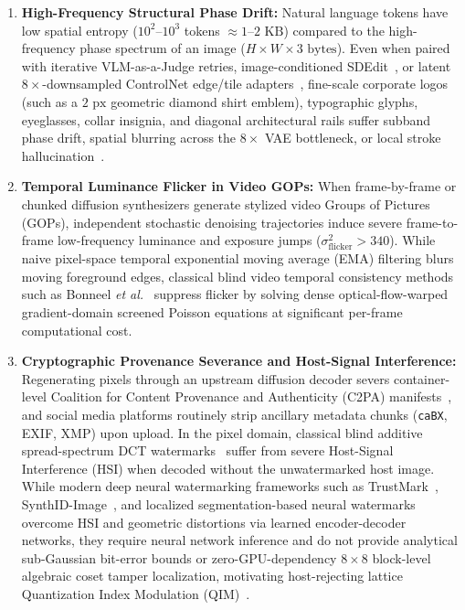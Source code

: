 \documentclass[conference,10pt]{IEEEtran}
\begin{document}
\begin{enumerate}
    \item \textbf{High-Frequency Structural Phase Drift:} Natural language tokens have low spatial entropy ($10^2\text{--}10^3$ tokens $\approx 1\text{--}2\text{ KB}$) compared to the high-frequency phase spectrum of an image ($H \times W \times 3\text{ bytes}$). Even when paired with iterative VLM-as-a-Judge retries, image-conditioned SDEdit~\cite{meng2022sdedit}, or latent $8\times$-downsampled ControlNet edge/tile adapters~\cite{zhang2023}, fine-scale corporate logos (such as a $2\text{ px}$ geometric diamond shirt emblem), typographic glyphs, eyeglasses, collar insignia, and diagonal architectural rails suffer subband phase drift, spatial blurring across the $8\times$ VAE bottleneck, or local stroke hallucination~\cite{wang2004}.
    \item \textbf{Temporal Luminance Flicker in Video GOPs:} When frame-by-frame or chunked diffusion synthesizers generate stylized video Groups of Pictures (GOPs), independent stochastic denoising trajectories induce severe frame-to-frame low-frequency luminance and exposure jumps ($\sigma^2_{\text{flicker}} > 340$). While naive pixel-space temporal exponential moving average (EMA) filtering blurs moving foreground edges, classical blind video temporal consistency methods such as Bonneel \emph{et al.}~\cite{bonneel2015blind} suppress flicker by solving dense optical-flow-warped gradient-domain screened Poisson equations at significant per-frame computational cost.
    \item \textbf{Cryptographic Provenance Severance and Host-Signal Interference:} Regenerating pixels through an upstream diffusion decoder severs container-level Coalition for Content Provenance and Authenticity (C2PA) manifests~\cite{c2pa2024,iso19566,iso15948}, and social media platforms routinely strip ancillary metadata chunks (\texttt{caBX}, EXIF, XMP) upon upload. In the pixel domain, classical blind additive spread-spectrum DCT watermarks~\cite{cox1997} suffer from severe Host-Signal Interference (HSI) when decoded without the unwatermarked host image. While modern deep neural watermarking frameworks such as TrustMark~\cite{bui2023trustmark}, SynthID-Image~\cite{gowal2025}, and localized segmentation-based neural watermarks~\cite{sander2025wam} overcome HSI and geometric distortions via learned encoder-decoder networks, they require neural network inference and do not provide analytical sub-Gaussian bit-error bounds or zero-GPU-dependency $8\times 8$ block-level algebraic coset tamper localization, motivating host-rejecting lattice Quantization Index Modulation (QIM)~\cite{chen2001}.
\end{enumerate}
\end{document}
